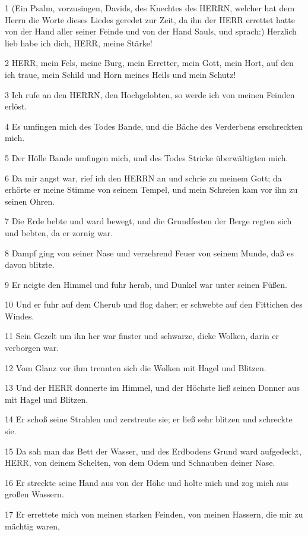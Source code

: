 \par 1 (Ein Psalm, vorzusingen, Davids, des Knechtes des HERRN, welcher hat dem Herrn die Worte dieses Liedes geredet zur Zeit, da ihn der HERR errettet hatte von der Hand aller seiner Feinde und von der Hand Sauls, und sprach:) Herzlich lieb habe ich dich, HERR, meine Stärke!
\par 2 HERR, mein Fels, meine Burg, mein Erretter, mein Gott, mein Hort, auf den ich traue, mein Schild und Horn meines Heils und mein Schutz!
\par 3 Ich rufe an den HERRN, den Hochgelobten, so werde ich von meinen Feinden erlöst.
\par 4 Es umfingen mich des Todes Bande, und die Bäche des Verderbens erschreckten mich.
\par 5 Der Hölle Bande umfingen mich, und des Todes Stricke überwältigten mich.
\par 6 Da mir angst war, rief ich den HERRN an und schrie zu meinem Gott; da erhörte er meine Stimme von seinem Tempel, und mein Schreien kam vor ihn zu seinen Ohren.
\par 7 Die Erde bebte und ward bewegt, und die Grundfesten der Berge regten sich und bebten, da er zornig war.
\par 8 Dampf ging von seiner Nase und verzehrend Feuer von seinem Munde, daß es davon blitzte.
\par 9 Er neigte den Himmel und fuhr herab, und Dunkel war unter seinen Füßen.
\par 10 Und er fuhr auf dem Cherub und flog daher; er schwebte auf den Fittichen des Windes.
\par 11 Sein Gezelt um ihn her war finster und schwarze, dicke Wolken, darin er verborgen war.
\par 12 Vom Glanz vor ihm trennten sich die Wolken mit Hagel und Blitzen.
\par 13 Und der HERR donnerte im Himmel, und der Höchste ließ seinen Donner aus mit Hagel und Blitzen.
\par 14 Er schoß seine Strahlen und zerstreute sie; er ließ sehr blitzen und schreckte sie.
\par 15 Da sah man das Bett der Wasser, und des Erdbodens Grund ward aufgedeckt, HERR, von deinem Schelten, von dem Odem und Schnauben deiner Nase.
\par 16 Er streckte seine Hand aus von der Höhe und holte mich und zog mich aus großen Wassern.
\par 17 Er errettete mich von meinen starken Feinden, von meinen Hassern, die mir zu mächtig waren,
